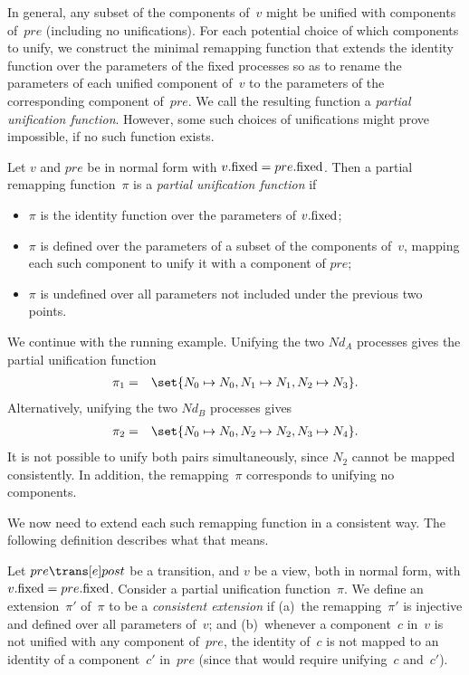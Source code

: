 
In general, any subset of the components of~$v$ might be unified with
components of~$pre$ (including no unifications).  For each potential choice of
which components to unify, we construct the minimal remapping function that
extends the identity function over the parameters of the fixed processes so as
to rename the parameters of each unified component of~$v$ to the parameters of
the corresponding component of~$pre$.  We call the resulting function a
\emph{partial unification function}.  However, some such choices of
unifications might prove impossible, if no such function exists.
%
\begin{definition}
Let $v$ and $pre$ be in normal form with $v.\mathrm{fixed} = pre.\mathrm{fixed}$.  Then a
partial remapping function~$\pi$ is a \emph{partial unification function} if
\begin{itemize}
\item $\pi$ is the identity function over the parameters of $v.\mathrm{fixed}$;

\item $\pi$ is defined over the parameters of a subset of the components
  of~$v$, mapping each such component to unify it with a component of $pre$;

\item $\pi$ is undefined over all parameters not included under the previous
  two points.
\end{itemize}
\end{definition}


\begin{example}
\label{example:effectOn-running-2}
We continue with the running example.  Unifying the two $Nd_A$ processes
gives the partial unification function
%
\begin{eqnarray*}
\pi_1 & = & \set{N_0 \mapsto N_0, N_1 \mapsto N_1, N_2 \mapsto N_3}.
\end{eqnarray*}
%
Alternatively, unifying the two $Nd_B$ processes gives
\begin{eqnarray*}
\pi_2 & = & \set{N_0 \mapsto N_0, N_2 \mapsto N_2, N_3 \mapsto N_4}.
\end{eqnarray*}
It is not possible to unify both pairs simultaneously, since $N_2$ cannot be
mapped consistently.  In addition, the remapping~$\pi$ corresponds to unifying
no components.
\end{example}

We now need to extend each such remapping function in a consistent way.  The
following definition describes what that means.
%
\begin{definition}
\label{def:consistent-extension}
Let $pre \trans[e] post$ be a transition, and $v$ be a view, both in normal
form, with $v.\mathrm{fixed} = pre.\mathrm{fixed}$.
%
Consider a partial unification function~$\pi$.  We define an extension~$\pi'$
of~$\pi$ to be a \emph{consistent extension} if (a)~the remapping~$\pi'$ is
injective and defined over all parameters of~$v$; and (b)~whenever a
component~$c$ in~$v$ is not unified with any component of~$pre$, the identity
of~$c$ is not mapped to an identity of a component~$c'$ in~$pre$ (since that
would require unifying~$c$ and~$c'$).
\end{definition}

